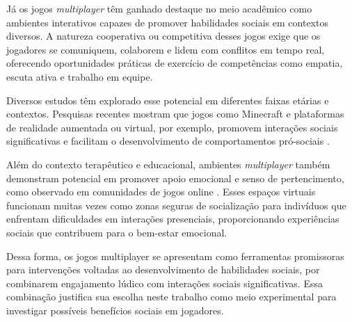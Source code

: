 Já os jogos \textit{multiplayer}  têm ganhado destaque no meio acadêmico como ambientes interativos capazes de promover habilidades sociais em contextos diversos. A natureza cooperativa ou competitiva desses jogos exige que os jogadores se comuniquem, colaborem e lidem com conflitos em tempo real, oferecendo oportunidades práticas de exercício de competências como empatia, escuta ativa e trabalho em equipe.

Diversos estudos têm explorado esse potencial em diferentes faixas etárias e contextos. Pesquisas recentes mostram que jogos como Minecraft e plataformas de realidade aumentada ou virtual, por exemplo, promovem interações sociais significativas e facilitam o desenvolvimento de comportamentos pró-sociais \cite{Jagannath2020, Bailey2021}.

Além do contexto terapêutico e educacional, ambientes \textit{multiplayer} também demonstram potencial em promover apoio emocional e senso de pertencimento, como observado em comunidades de jogos online \cite{Martoncik2016}. Esses espaços virtuais funcionam muitas vezes como zonas seguras de socialização para indivíduos que enfrentam dificuldades em interações presenciais, proporcionando experiências sociais que contribuem para o bem-estar emocional.

Dessa forma, os jogos multiplayer se apresentam como ferramentas promissoras para intervenções voltadas ao desenvolvimento de habilidades sociais, por combinarem engajamento lúdico com interações sociais significativas. Essa combinação justifica sua escolha neste trabalho como meio experimental para investigar possíveis benefícios sociais em jogadores.